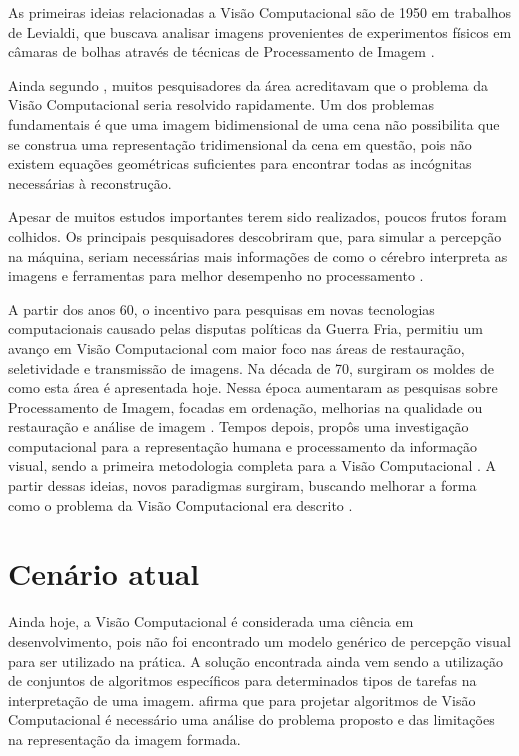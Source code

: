 As primeiras ideias relacionadas a Visão Computacional são de 1950 em trabalhos de Levialdi, que buscava analisar imagens provenientes de experimentos físicos em câmaras de bolhas através de técnicas de Processamento de Imagem \cite{JOLION}.

Ainda segundo , muitos pesquisadores da área acreditavam que o problema da Visão Computacional seria resolvido rapidamente. Um dos problemas fundamentais é que uma imagem bidimensional de uma cena não possibilita que se construa uma representação tridimensional da cena em questão, pois não existem equações geométricas suficientes para encontrar todas as incógnitas necessárias à reconstrução.

Apesar de muitos estudos importantes terem sido realizados, poucos frutos foram colhidos. Os principais pesquisadores descobriram que, para simular a percepção na máquina, seriam necessárias mais informações de como o cérebro interpreta as imagens e ferramentas para melhor desempenho no processamento \cite{REINALDO}.

A partir dos anos 60, o incentivo para pesquisas em novas tecnologias computacionais causado pelas disputas políticas da Guerra Fria, permitiu um avanço em Visão Computacional com maior foco nas áreas de restauração, seletividade e transmissão de imagens. Na década de 70, surgiram os moldes de como esta área é apresentada hoje. Nessa época aumentaram as pesquisas sobre Processamento de Imagem, focadas em ordenação, melhorias na qualidade ou restauração e análise de imagem \cite{ANDREWS}. Tempos depois,  propôs uma investigação computacional para a representação humana e processamento da informação visual, sendo a primeira metodologia completa para a Visão Computacional \cite{JOLION}. A partir dessas ideias, novos paradigmas surgiram, buscando melhorar a forma como o problema da Visão Computacional era descrito \cite{BLACK} \cite{BAJCSY} \cite{BALLARD} \cite{ALOIMONOS}.

\section{Cenário atual}
\label{section:cenario_atual}

Ainda hoje, a Visão Computacional é considerada uma ciência em desenvolvimento, pois não foi encontrado um modelo genérico de percepção visual para ser utilizado na prática. A solução encontrada ainda vem sendo a utilização de conjuntos de algoritmos específicos para determinados tipos de tarefas na interpretação de uma imagem.  afirma que para projetar algoritmos de Visão Computacional é necessário uma análise do problema proposto e das limitações na representação da imagem formada.

